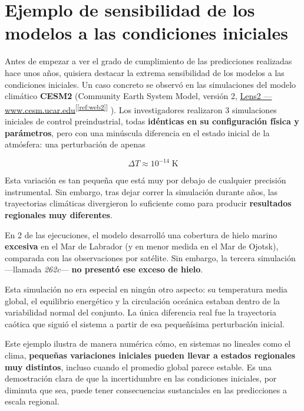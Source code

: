 \documentclass[
  10pt,
  a4paper,
  DIV=11,
  numbers=noendperiod,
  open=any]{scrreprt}
\numberwithin{equation}{chapter}
\numberwithin{equation}{section}
\renewcommand{\[}{\begin{equation}}
\renewcommand{\]}{\end{equation}}
\newcommand{\refweb}[3]{%
  \href{#1}{#2}\textsuperscript{[\ref{ref:#3}]}%
}
\begin{document}
\section{Ejemplo de sensibilidad de los modelos a las condiciones
iniciales}\label{ejemplo-de-sensibilidad-de-los-modelos-a-las-condiciones-iniciales}

Antes de empezar a ver el grado de cumplimiento de las predicciones realizadas hace unos años, quisiera destacar la extrema sensibilidad de los modelos a las condiciones iniciales. Un caso concreto se observó en las simulaciones del modelo climático
\textbf{CESM2} (Community Earth System Model, versión
2, \refweb{https://www.cesm.ucar.edu/community-projects/lens2}{Lens2 — www.cesm.ucar.edu}{web2} ). Los investigadores realizaron 3
simulaciones iniciales de control preindustrial, todas \textbf{idénticas
en su configuración física y parámetros}, pero con una minúscula
diferencia en el estado inicial de la atmósfera: una perturbación de
apenas

\begin{equation}
\Delta T \approx 10^{-14} \; \text{K}
\end{equation}

Esta variación es tan pequeña que está muy por debajo de cualquier
precisión instrumental. Sin embargo, tras dejar correr la simulación
durante años, las trayectorias climáticas divergieron lo suficiente como
para producir \textbf{resultados regionales muy diferentes}.

En 2 de las ejecuciones, el modelo desarrolló una cobertura de hielo
marino \textbf{excesiva} en el Mar de Labrador (y en menor medida en el
Mar de Ojotsk), comparada con las observaciones por satélite. Sin
embargo, la tercera simulación ---llamada \emph{262c}--- \textbf{no
presentó ese exceso de hielo}.

Esta simulación no era especial en ningún otro aspecto: su temperatura
media global, el equilibrio energético y la circulación oceánica estaban
dentro de la variabilidad normal del conjunto. La única diferencia real
fue la trayectoria caótica que siguió el sistema a partir de esa
pequeñísima perturbación inicial.

Este ejemplo ilustra de manera numérica cómo, en sistemas no lineales
como el clima, \textbf{pequeñas variaciones iniciales pueden llevar a
estados regionales muy distintos}, incluso cuando el promedio global
parece estable. Es una demostración clara de que la incertidumbre en las
condiciones iniciales, por diminuta que sea, puede tener consecuencias
sustanciales en las predicciones a escala regional.
\end{document}
